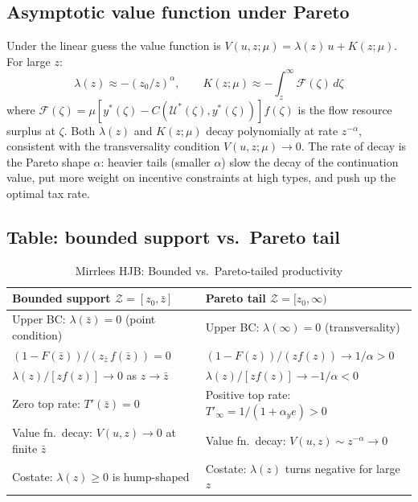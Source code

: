 \documentclass[12pt]{article}
\newcommand{\calU}{\mathcal{U}}
\newcommand{\calZ}{\mathcal{Z}}
\newcommand{\zbar}{\bar{z}}
\newcommand{\zlow}{z_{0}}
\begin{document}
\subsection{Asymptotic value function under Pareto}

Under the linear guess the value function is $V(u,z;\mu) = \lambda(z)\,u +
K(z;\mu)$.  For large $z$:
\begin{equation}\label{eq:pareto_V}
  \lambda(z) \approx -(\zlow/z)^\alpha, \qquad
  K(z;\mu) \approx -\int_z^\infty \mathcal{F}(\zeta)\,d\zeta
\end{equation}
where $\mathcal{F}(\zeta) = \mu[y^*(\zeta)-C(\calU^*(\zeta),y^*(\zeta))]f(\zeta)$
is the flow resource surplus at $\zeta$.  Both $\lambda(z)$ and $K(z;\mu)$
decay polynomially at rate $z^{-\alpha}$, consistent with the transversality
condition $V(u,z;\mu) \to 0$.  The rate of decay is the Pareto shape
$\alpha$: heavier tails (smaller $\alpha$) slow the decay of the continuation
value, put more weight on incentive constraints at high types, and push up the
optimal tax rate.

\subsection{Table: bounded support vs.\ Pareto tail}

\begin{table}[h!]
\centering
\caption{Mirrlees HJB: Bounded vs.\ Pareto-tailed productivity}
\label{tab:pareto}
\renewcommand{\arraystretch}{1.45}
\begin{tabular}{@{} p{5.8cm} p{5.8cm} @{}}
\toprule
\textbf{Bounded support $\calZ=[\zlow,\zbar]$} &
\textbf{Pareto tail $\calZ=[\zlow,\infty)$} \\
\midrule
Upper BC: $\lambda(\zbar)=0$ (point condition) &
Upper BC: $\lambda(\infty)=0$ (transversality) \\
$(1-F(\zbar))/(z_{\bar{z}}\,f(\zbar)) = 0$ &
$(1-F(z))/(zf(z)) \to 1/\alpha > 0$ \\
$\lambda(z)/[zf(z)] \to 0$ as $z\to\zbar$ &
$\lambda(z)/[zf(z)] \to -1/\alpha < 0$ \\
Zero top rate: $T'(\zbar)=0$ &
Positive top rate: $T'_\infty=1/(1+\alpha_y e)>0$ \\
Value fn.\ decay: $V(u,z)\to 0$ at finite $\zbar$ &
Value fn.\ decay: $V(u,z)\sim z^{-\alpha}\to 0$ \\
Costate: $\lambda(z)\geq 0$ is hump-shaped &
Costate: $\lambda(z)$ turns negative for large $z$ \\
\bottomrule
\end{tabular}
\end{table}
\end{document}
